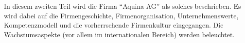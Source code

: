 \begin{sloppypar}
In diesem zweiten Teil wird die Firma "`Aquina AG"' als solches beschrieben. Es wird dabei auf die Firmengeschichte, Firmenorganisation, Unternehmenswerte, Kompetenzmodell und die vorherrschende Firmenkultur eingegangen. Die Wachstumsaspekte (vor allem im internationalen Bereich) werden beleuchtet.
\end{sloppypar}
